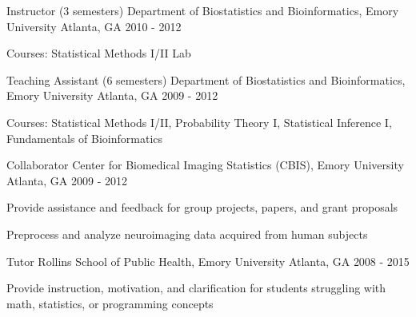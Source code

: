 \begin{cventries}

\cventry
{Instructor (3 semesters)} %
{Department of Biostatistics and Bioinformatics, Emory University} %
{Atlanta, GA} %
{2010 - 2012} %
{ %
\begin{cvitems}
\item {Courses:	Statistical Methods I/II Lab}
\end{cvitems}
}



\cventry
{Teaching Assistant (6 semesters)} %
{Department of Biostatistics and Bioinformatics, Emory University} %
{Atlanta, GA} %
{2009 - 2012} %
{ %
\begin{cvitems}
\item {Courses:	Statistical Methods I/II, Probability Theory I, Statistical Inference I, Fundamentals of Bioinformatics}
\end{cvitems}
}



\cventry
{Collaborator} %
{Center for Biomedical Imaging Statistics (CBIS), Emory University} %
{Atlanta, GA} %
{2009 - 2012} %
{ %
\begin{cvitems}
\item {Provide assistance and feedback for group projects, papers, and grant proposals}
\item {Preprocess and analyze neuroimaging data acquired from human subjects}
\end{cvitems}
}


\cventry
{Tutor} %
{Rollins School of Public Health, Emory University} %
{Atlanta, GA} %
{2008 - 2015} %
{ %
\begin{cvitems}
\item {Provide instruction, motivation, and clarification for students struggling with math, statistics, or programming concepts}
\end{cvitems}
}




\end{cventries}
